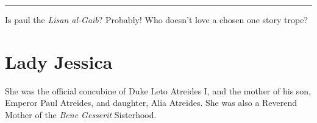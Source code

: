 \documentclass[
  openany]{book}
\begin{document}
\begin{center}\rule{0.5\linewidth}{0.5pt}\end{center}

Is paul the \emph{Lisan al-Gaib}? Probably! Who doesn't love a chosen one story trope?

\hypertarget{lady-jessica}{%
\chapter{Lady Jessica}\label{lady-jessica}}

She was the official concubine of Duke Leto Atreides I, and the mother of his son, Emperor Paul Atreides, and daughter, Alia Atreides. She was also a Reverend Mother of the \emph{Bene Gesserit} Sisterhood.
\end{document}
